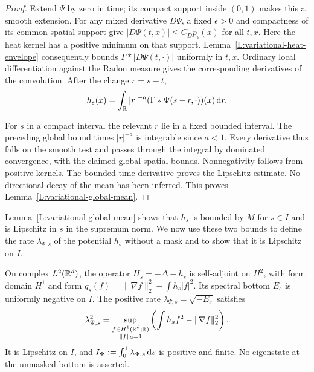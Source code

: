 \begin{proof}
  Extend $\Psi$ by zero in time; its compact support inside $(0,1)$ makes this a
  smooth extension. For any mixed derivative $D\Psi$, a fixed $\epsilon > 0$ and
  compactness of its common spatial support give $|D\Psi(t,x)| \le
  C_Dp_\epsilon(x)$ for all $t,x$. Here the heat kernel has a positive minimum
  on that support. Lemma~\ref{L:variational-heat-envelope} consequently bounds
  $\Gamma*|D\Psi(t,\cdot)|$ uniformly in $t,x$. Ordinary local differentiation
  against the Radon measure gives the corresponding derivatives of the
  convolution. After the change $r = s-t$,
  \[
    h_s(x)=\int_{\mathbb{R}} |r|^{-a}
    (\Gamma*\Psi(s-r,\cdot))(x)\,\mathrm{d} r.
  \]

  For $s$ in a compact interval the relevant $r$ lie in a fixed bounded
  interval. The preceding global bound times $|r|^{-a}$ is integrable since $a <
  1$. Every derivative thus falls on the smooth test and passes through the
  integral by dominated convergence, with the claimed global spatial bounds.
  Nonnegativity follows from positive kernels. The bounded time derivative
  proves the Lipschitz estimate. No directional decay of the mean has been
  inferred. This proves Lemma~\ref{L:variational-global-mean}.
\end{proof}

Lemma~\ref{L:variational-global-mean} shows that $h_s$ is bounded by $M$ for $s
\in I$ and is Lipschitz in $s$ in the supremum norm. We now use these two bounds
to define the rate $\lambda_{\Psi,s}$ of the potential $h_s$ without a mask and
to show that it is Lipschitz on $I$.

\begin{proposition}
  \label{P:variational-unmasked-rate}
  On complex $L^2(\mathbb{R}^d)$, the operator $H_s = -\Delta-h_s$ is self-adjoint on
  $H^2$, with form domain $H^1$ and form $q_s(f) = \|\nabla f\|_2^2-\int
  h_s|f|^2$. Its spectral bottom $E_s$ is uniformly negative on $I$. The
  positive rate $\lambda_{\Psi,s} = \sqrt{-E_s}$ satisfies
  \begin{equation}\label{E:variational-real-rayleigh}
    \lambda_{\Psi,s}^2
    =\sup_{\substack{f\in H^1(\mathbb{R}^d;\mathbb{R})\\\|f\|_2=1}}
    \left(\int h_sf^2-\|\nabla f\|_2^2\right).
  \end{equation}
  It is Lipschitz on $I$, and $I_\Psi: = \int_0^1\lambda_{\Psi,s}\,\mathrm{d} s$ is
  positive and finite. No eigenstate at the unmasked bottom is asserted.
\end{proposition}

